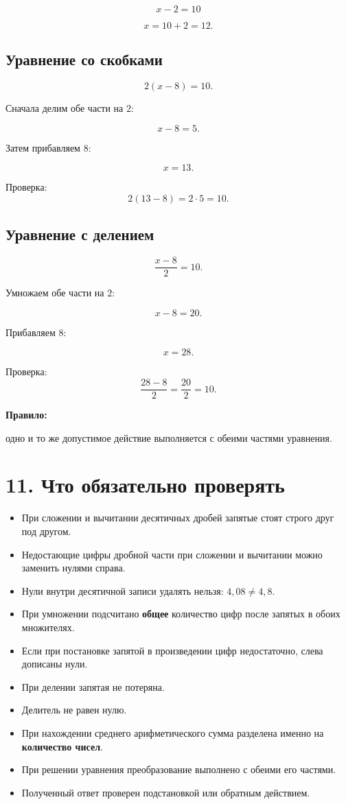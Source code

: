 \documentclass[a4paper,12pt]{article}
\newcommand{\sectiontitle}[1]{%
  \section*{\color{darkaccent}#1}%
}
\newcommand{\important}[1]{%
  \textbf{\color{darkaccent}#1}%
}
\newcommand{\checkmarkitem}{%
  \item[\(\square\)]%
}
\begin{document}
\[
x-2=10
\]

\[
x=10+2=12.
\]

\subsection*{\color{accent}Уравнение со скобками}

\[
2(x-8)=10.
\]

Сначала делим обе части на \(2\):

\[
x-8=5.
\]

Затем прибавляем \(8\):

\[
\boxed{x=13}.
\]

Проверка:
\[
2(13-8)=2\cdot5=10.
\]

\subsection*{\color{accent}Уравнение с делением}

\[
\frac{x-8}{2}=10.
\]

Умножаем обе части на \(2\):

\[
x-8=20.
\]

Прибавляем \(8\):

\[
\boxed{x=28}.
\]

Проверка:
\[
\frac{28-8}{2}
=
\frac{20}{2}
=
10.
\]

\important{Правило:}
одно и то же допустимое действие выполняется с обеими частями
уравнения.


\sectiontitle{11. Что обязательно проверять}

\begin{itemize}
  \checkmarkitem
  При сложении и вычитании десятичных дробей
  запятые стоят строго друг под другом.

  \checkmarkitem
  Недостающие цифры дробной части при сложении и вычитании
  можно заменить нулями справа.

  \checkmarkitem
  Нули внутри десятичной записи удалять нельзя:
  \(4{,}08\ne4{,}8\).

  \checkmarkitem
  При умножении подсчитано \textbf{общее} количество цифр
  после запятых в обоих множителях.

  \checkmarkitem
  Если при постановке запятой в произведении цифр недостаточно,
  слева дописаны нули.

  \checkmarkitem
  При делении запятая не потеряна.

  \checkmarkitem
  Делитель не равен нулю.

  \checkmarkitem
  При нахождении среднего арифметического сумма разделена
  именно на \textbf{количество чисел}.

  \checkmarkitem
  При решении уравнения преобразование выполнено
  с обеими его частями.

  \checkmarkitem
  Полученный ответ проверен подстановкой или обратным действием.
\end{itemize}
\end{document}
